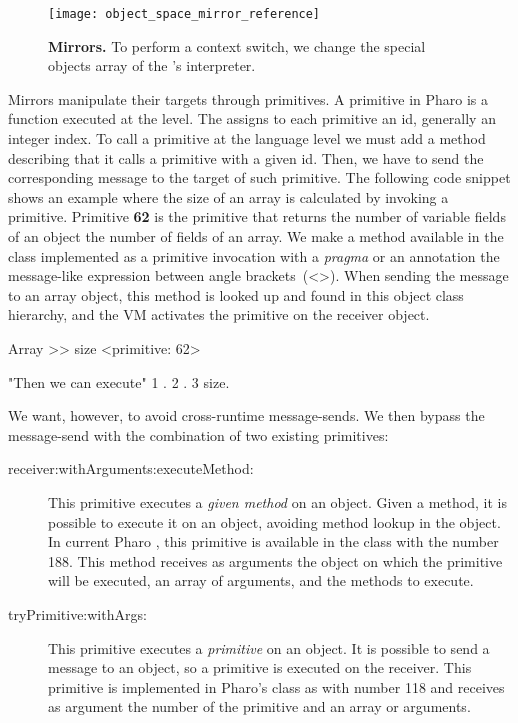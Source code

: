\begin{figure}[htb]
\begin{center}
\texttt{[image: object\_space\_mirror\_reference]}
\caption{\textbf{Mirrors.} To perform a context switch, we change the special objects array of the \VM's interpreter.\label{fig:mirror_reference}}
\end{center}
\end{figure}

Mirrors manipulate their targets through \VM primitives. A primitive in Pharo is a function executed at the \VM level. The \VM assigns to each primitive an id, generally an integer index. To call a primitive at the language level we must add a method describing that it calls a primitive with a given id. Then, we have to send the corresponding message to the target of such primitive. The following code snippet shows an example where the size of an array is calculated by invoking a primitive. Primitive \textbf{62} is the primitive that returns the number of variable fields of an object \eg the number of fields of an array. We make a method  available in the  class implemented as a primitive invocation with a \emph{pragma} or an annotation \ie the message-like expression between angle brackets~(<>). When sending the message  to an array object, this method is looked up and found in this object class hierarchy, and the VM activates the primitive on the receiver object.

\begin{code}
Array >> size
    <primitive: 62>

"Then we can execute"
{1 . 2 . 3} size.
\end{code}

We want, however, to avoid cross-runtime message-sends. We then bypass the message-send with the combination of two existing primitives:
\begin{description}

\item[receiver:withArguments:executeMethod:] This primitive executes a \emph{given method} on an object. Given a method, it is possible to execute it on an object, avoiding method lookup in the object. In current Pharo \VM, this primitive is available in the  class with the number 188. This method receives as arguments the object on which the primitive will be executed, an array of arguments, and the methods to execute.

\item[tryPrimitive:withArgs:] This primitive executes a \emph{primitive} on an object. It is possible to send a message to an object, so a primitive is executed on the receiver. This primitive is implemented in Pharo's  class as \textbf{} with number 118 and receives as argument the number of the primitive and an array or arguments.
\end{description}

